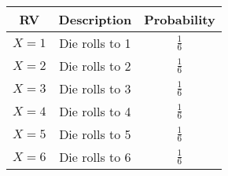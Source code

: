 
\begin{center}
\begin{tabular}{|c|c|c|}
\hline
\textbf{RV} & \textbf{Description} & \textbf{Probability}\\ \hline
$X = 1$	    &   Die rolls to 1  & $\frac{1}{6}$\\ \hline
$X = 2$	    &   Die rolls to 2  & $\frac{1}{6}$\\ \hline
$X = 3$	    &   Die rolls to 3  & $\frac{1}{6}$\\ \hline
$X = 4$	    &   Die rolls to 4  & $\frac{1}{6}$\\ \hline
$X = 5$	    &   Die rolls to 5  & $\frac{1}{6}$\\ \hline
$X = 6$	    &   Die rolls to 6  & $\frac{1}{6}$\\ \hline
\end{tabular}
\end{center}
